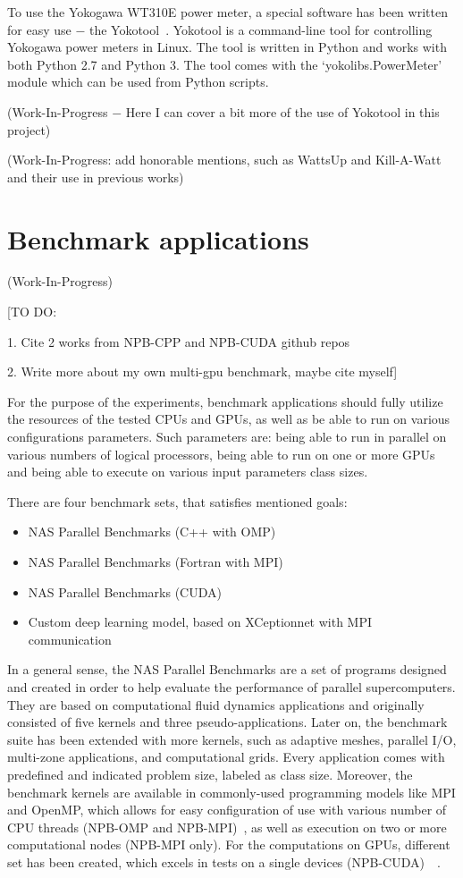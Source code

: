 To use the Yokogawa WT310E power meter, a special software has
been written for easy use $-$ the Yokotool~\cite{GitHub_intel/yoko-tool}.
Yokotool is a command-line tool for controlling Yokogawa power
meters in Linux. The tool is written in Python and works with both
Python 2.7 and Python 3. The tool comes with the
`yokolibs.PowerMeter' module which can be used from Python scripts.

(Work-In-Progress $-$ Here I can cover a bit more of the use
of Yokotool in this project)

(Work-In-Progress: add honorable mentions, such as WattsUp
and Kill-A-Watt~\cite{Power_Aware_GPU_Computing} and their
use in previous works)

\section{Benchmark applications}

(Work-In-Progress)

[TO DO\@:

1. Cite 2 works from NPB-CPP and NPB-CUDA github repos

2. Write more about my own multi-gpu benchmark, maybe cite myself]

For the purpose of the experiments, benchmark applications should
fully utilize the resources of the tested CPUs and GPUs, as well as
be able to run on various configurations parameters. Such parameters
are: being able to run in parallel on various numbers of logical
processors, being able to run on one or more GPUs and being able to
execute on various input parameters class sizes.

There are four benchmark sets, that satisfies mentioned goals:
\begin{itemize}
    \item NAS Parallel Benchmarks (C++ with OMP)
    \item NAS Parallel Benchmarks (Fortran with MPI)
    \item NAS Parallel Benchmarks (CUDA)
    \item Custom deep learning model, based on XCeptionnet with MPI communication
\end{itemize}

In a general sense, the NAS Parallel Benchmarks are a set of programs designed
and created in order to help evaluate the performance of parallel
supercomputers. They are based on computational fluid dynamics applications and
originally consisted of five kernels and three pseudo-applications. Later on,
the benchmark suite has been extended with more kernels, such as adaptive meshes,
parallel I/O, multi-zone applications, and computational grids. Every application
comes with predefined and indicated problem size, labeled as class size.
Moreover, the benchmark kernels are available in commonly-used programming
models like MPI and OpenMP, which allows for easy configuration of use with
various number of CPU threads (NPB-OMP and NPB-MPI)~\cite{NPB-CPP}, as well
as execution on two or more computational nodes (NPB-MPI only). For the
computations on GPUs, different set has been created, which excels in tests
on a single devices (NPB-CUDA)~\cite{NPB-CUDA_1}~\cite{NPB-CUDA_2}.

